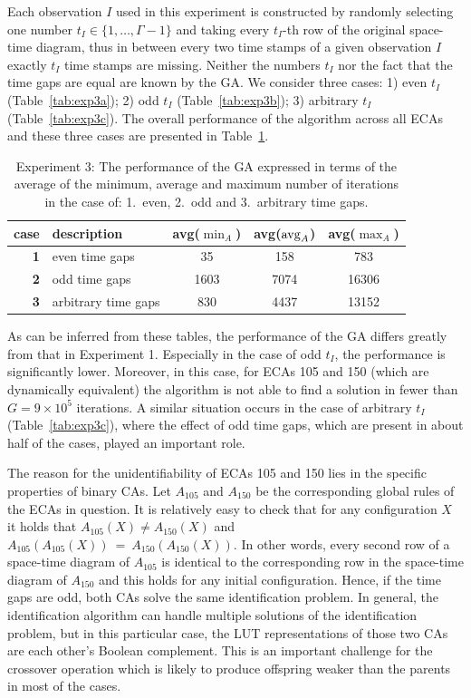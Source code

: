 Each observation $I$ used in this experiment is constructed by randomly selecting one number $t_I \in \{1,\dotsc,\Gamma-1\}$ and taking every $t_I$-th row of the original space-time diagram, thus in between every two time stamps of a given observation $I$ exactly $t_I$ time stamps are missing. Neither the numbers $t_I$ nor the fact that the time gaps are equal are known by the GA. We consider three cases: 1) even $t_I$  (Table~\ref{tab:exp3a}); 2) odd $t_I$ (Table~\ref{tab:exp3b}); 3) arbitrary $t_I$ (Table~\ref{tab:exp3c}). The overall performance of the algorithm across all ECAs and these three cases are presented in Table~\ref{tab:exp3}.
\begin{table}[ht]
	\centering
	\caption{Experiment 3: The performance of the GA expressed in terms of the average of the minimum, average and maximum number of iterations in the case of: 1.\ even, 2.\ odd and 3.\ arbitrary time gaps.}\label{tab:exp3}
	\begin{tabular}{r|l|c|c|c}
		{\bf case} & {\bf description}   & {\bf avg($\min_A$)} & {\bf avg($\operatorname{avg}_A$)} & {\bf avg($\max_A$)} \\ \hline
		{\bf 1}    & even time gaps      & 35                  & 158                 & 783                 \\
		{\bf 2}    & odd time gaps       & 1603                & 7074                & 16306               \\
		{\bf 3}    & arbitrary time gaps & 830                 & 4437                & 13152
	\end{tabular}
\end{table}

As can be inferred from these tables, the performance of the GA differs greatly from that in Experiment 1. Especially in the case of odd $t_I$, the performance is significantly lower. Moreover, in this case, for ECAs 105 and 150 (which are dynamically equivalent) the algorithm is not able to find a solution in fewer than $G=9\times 10^5$ iterations. A similar situation occurs in the case of arbitrary $t_I$ (Table~\ref{tab:exp3c}), where the effect of odd time gaps, which are present in about half of the cases, played an important role.

The reason for the unidentifiability of ECAs 105 and 150 lies in the specific properties of binary CAs. Let $A_{105}$ and $A_{150}$ be the corresponding global rules of the ECAs in question. It is relatively easy to check that for any configuration $X$ it holds that $A_{105}(X) \neq A_{150}(X)$ and $A_{105}(A_{105}(X))~=~A_{150}(A_{150}(X))$. In other words, every second row of a space-time diagram of $A_{105}$ is identical to the corresponding row in the space-time diagram of $A_{150}$ and this holds for any initial configuration. Hence, if the time gaps are odd, both CAs solve the same identification problem. In general, the identification algorithm can handle multiple solutions of the identification problem, but in this particular case, the LUT representations of those two CAs are each other's Boolean complement. This is an important challenge for the crossover operation which is likely to produce  offspring weaker than the parents in most of the cases.

